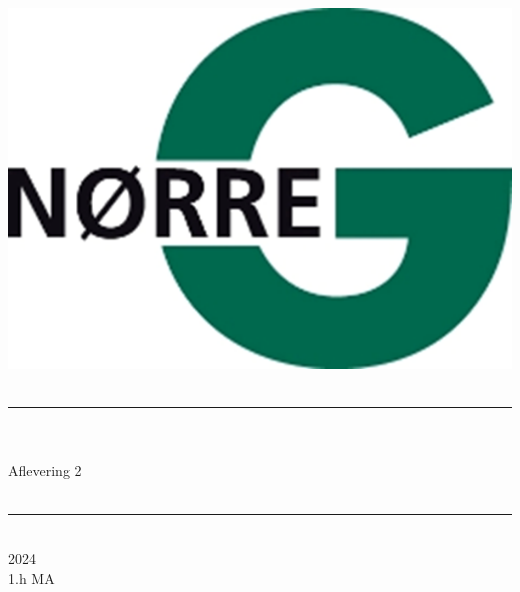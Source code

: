 \documentclass[12pt,x11names,a4paper]{article}
\begin{document}
%

\begin{titlepage}

\begin{minipage}{0.27\textwidth}

\end{minipage}
\begin{minipage}{0.73\textwidth}
\begin{center}
\phantom{h} \vspace{1cm}\\
\hspace{4cm}
\includegraphics[scale = 1]{Billeder/Norreg.png} \\
\phantom{h} \vspace{5cm}\\
\rule{0.7\textwidth}{0.3mm}\\
\phantom{h}\\
{\fontsize{50}{60}\selectfont Aflevering 2}\\
\phantom{h}\\
\rule{0.7\textwidth}{0.3mm}\\
\Large 2024\\
\Large 1.h MA

\end{center}
\end{minipage}
\end{titlepage}
\end{document}
